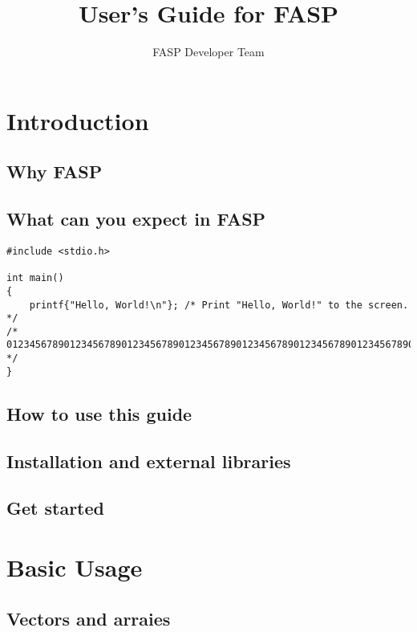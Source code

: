 \documentclass[11pt]{memoir}
\title{User's Guide for FASP}
\author{FASP Developer Team}
\begin{document}
\maketitle

\newpage
\tableofcontents

\chapter{Introduction}\label{ch:intro}

\section{Why FASP}

\section{What can you expect in FASP}

\begin{lstlisting}
#include <stdio.h>

int main()
{
	printf{"Hello, World!\n"}; /* Print "Hello, World!" to the screen. */
/*
012345678901234567890123456789012345678901234567890123456789012345678901234567890123456789
*/
}
\end{lstlisting}

\section{How to use this guide}

\section{Installation and external libraries}

\section{Get started}

\chapter{Basic Usage}\label{ch:basic}

\section{Vectors and arraies}
\end{document}
